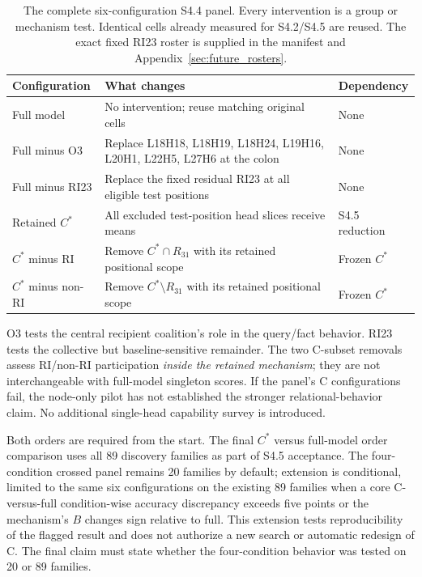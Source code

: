 \begin{table}[htbp]\centering\small
\begin{tabular}{p{.30\linewidth}p{.40\linewidth}p{.20\linewidth}}\toprule
Configuration & What changes & Dependency\\\midrule
Full model & No intervention; reuse matching original cells & None\\
Full minus O3 & Replace L18H18, L18H19, L18H24, L19H16, L20H1, L22H5, L27H6 at the colon & None\\
Full minus RI23 & Replace the fixed residual RI23 at all eligible test positions & None\\
Retained $C^*$ & All excluded test-position head slices receive means & S4.5 reduction\\
$C^*$ minus RI & Remove $C^*\cap R_{31}$ with its retained positional scope & Frozen $C^*$\\
$C^*$ minus non-RI & Remove $C^*\setminus R_{31}$ with its retained positional scope & Frozen $C^*$\\\bottomrule
\end{tabular}
\caption{The complete six-configuration S4.4 panel. Every intervention is a group or mechanism test. Identical cells already measured for S4.2/S4.5 are reused. The exact fixed RI23 roster is supplied in the manifest and Appendix~\ref{sec:future_rosters}.}
\label{tab:s44_configs}
\end{table}

O3 tests the central recipient coalition's role in the query/fact behavior. RI23 tests the collective but baseline-sensitive remainder. The two C-subset removals assess RI/non-RI participation \emph{inside the retained mechanism}; they are not interchangeable with full-model singleton scores. If the panel's C configurations fail, the node-only pilot has not established the stronger relational-behavior claim. No additional single-head capability survey is introduced.

Both orders are required from the start. The final $C^*$ versus full-model order comparison uses all 89 discovery families as part of S4.5 acceptance. The four-condition crossed panel remains 20 families by default; extension is conditional, limited to the same six configurations on the existing 89 families when a core C-versus-full condition-wise accuracy discrepancy exceeds five points or the mechanism's $B$ changes sign relative to full. This extension tests reproducibility of the flagged result and does not authorize a new search or automatic redesign of C. The final claim must state whether the four-condition behavior was tested on 20 or 89 families.

